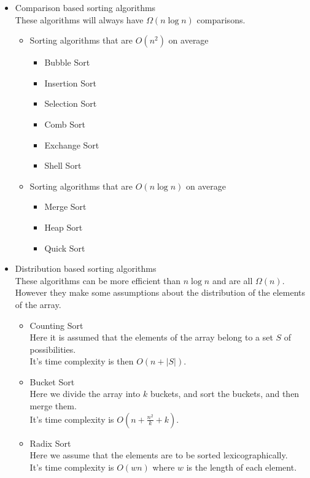 \documentclass[12pt]{report}
\begin{document}
\begin{itemize}
    \item Comparison based sorting algorithms\\
          These algorithms will always have $\Omega(n\log n)$ comparisons.
          \begin{itemize}
              \item Sorting algorithms that are $O(n^2)$ on average
                    \begin{itemize}
                        \item Bubble Sort
                        \item Insertion Sort
                        \item Selection Sort
                        \item Comb Sort
                        \item Exchange Sort
                        \item Shell Sort
                    \end{itemize}
              \item Sorting algorithms that are $O(n\log n)$ on average
                    \begin{itemize}
                        \item Merge Sort
                        \item Heap Sort
                        \item Quick Sort
                    \end{itemize}
          \end{itemize}
    \item Distribution based sorting algorithms\\
          These algorithms can be more efficient than $n\log n$ and are all $\Omega(n)$.\\
          However they make some assumptions about the distribution of the elements of the array.
          \begin{itemize}
              \item Counting Sort\\
                    Here it is assumed that the elements of the array belong to a set $S$ of possibilities.\\
                    It's time complexity is then $O(n + |S|)$.
              \item Bucket Sort\\
                    Here we divide the array into $k$ buckets, and sort the buckets, and then merge them.\\
                    It's time complexity is $O(n + \frac{n^{2}}{k} + k)$.
              \item Radix Sort\\
                    Here we assume that the elements are to be sorted lexicographically.\\
                    It's time complexity is $O(wn)$ where $w$ is the length of each element.
          \end{itemize}
\end{itemize}
\end{document}
